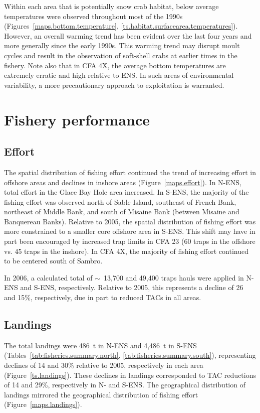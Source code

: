\documentclass[11pt]{article}
\begin{document}
Within each area that is potentially snow crab habitat, below average temperatures were observed throughout most of the 1990s (Figures~\ref{maps.bottom.temperature}, \ref{ts.habitat.surfacearea.temperatures}). However, an overall warming trend has been evident over the last four years and more generally since the early 1990s. This warming trend may disrupt moult cycles and  result in the observation of soft-shell crabs at earlier times in the fishery. Note also that in CFA 4X, the average bottom temperatures are extremely erratic and high relative to ENS. In such areas of environmental variability, a more precautionary approach to exploitation is warranted.


\section{Fishery performance}

\subsection{Effort}

The spatial distribution of fishing effort continued the trend of increasing effort in offshore areas and declines in inshore areas (Figure~\ref{maps.effort}). In N-ENS, total effort in the Glace Bay Hole area increased. In S-ENS, the majority of the fishing effort was observed north of Sable Island, southeast of French Bank, northeast of Middle Bank, and south of Misaine Bank (between Misaine and Banquereau Banks). Relative to 2005, the spatial distribution of fishing effort was more constrained to a smaller core offshore area in S-ENS. This shift may have in part been encouraged by increased trap limits in CFA 23 (60 traps in the offshore vs. 45 traps in the inshore). In CFA 4X, the majority of fishing effort continued to be centered south of Sambro.

In 2006, a calculated total of $\sim$~13,700 and 49,400 traps hauls were applied in N-ENS and S-ENS, respectively. Relative to 2005, this represents a decline of 26 and 15\%, respectively, due in part to reduced TACs in all areas.

\subsection{Landings}

The total landings were 486~t in N-ENS and 4,486~t in S-ENS (Tables~\ref{tab:fisheries.summary.north}, \ref{tab:fisheries.summary.south}), representing declines of 14 and 30\% relative to 2005, respectively in each area (Figure~\ref{ts.landings}). These declines in landings corresponded to TAC reductions of 14 and 29\%, respectively in N- and S-ENS. The geographical distribution of landings mirrored the geographical distribution of fishing effort  (Figure~\ref{maps.landings}).
\end{document}
